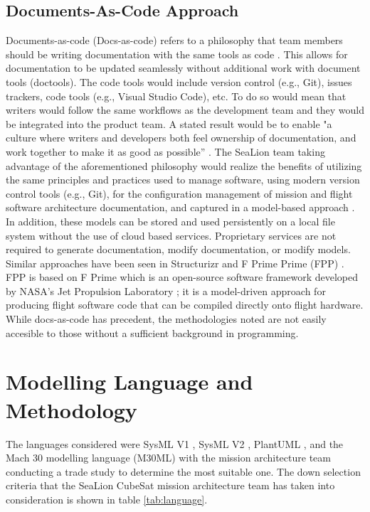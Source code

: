 \documentclass[journal,article,submit,pdftex,moreauthors]{Definitions/mdpi}
\begin{document}
\subsection{Documents-As-Code Approach}
Documents-as-code (Docs-as-code) refers to a philosophy that team members should be writing documentation with the same tools as code \cite{docs_as_code}.  This allows for documentation to be updated seamlessly without additional work with document tools (doctools).  The code tools would include version control (e.g., Git), issues trackers, code tools (e.g., Visual Studio Code), etc.  To do so would mean that writers would follow the same workflows as the development team and they would be integrated into the product team.  A stated result would be to enable "a culture where writers and developers both feel ownership of documentation, and work together to make it as good as possible” \cite{docs_as_code}.  The SeaLion team taking advantage of the aforementioned philosophy would realize the benefits of utilizing the same principles and practices used to manage software, using modern version control tools (e.g., Git), for the configuration management of mission and flight software architecture documentation, and captured in a model-based approach \cite{docs_as_code}.  In addition, these models can be stored and used persistently on a local file system without the use of cloud based services.  Proprietary services are not required to generate documentation, modify documentation, or modify models.  Similar approaches have been seen in Structurizr \cite{structurizr} and F Prime Prime (FPP) \cite{f_prime_prime}.  FPP is based on F Prime which is an open-source software framework developed by NASA's Jet Propulsion Laboratory \cite{f_prime}; it is a model-driven approach for producing flight software code that can be compiled directly onto flight hardware.  While docs-as-code has precedent, the methodologies noted are not easily accesible to those without a sufficient background in programming.


\section{Modelling Language and Methodology}
The languages considered were SysML V1 \cite{sys_ml}, SysML V2 \cite{sys_ml2}, PlantUML \cite{plantuml}, and the Mach 30 modelling language (M30ML) \cite{mach30_git} with the mission architecture team conducting a trade study to determine the most suitable one.  The down selection criteria that the SeaLion CubeSat mission architecture team has taken into consideration is shown in table \ref{tab:language}.
\end{document}
